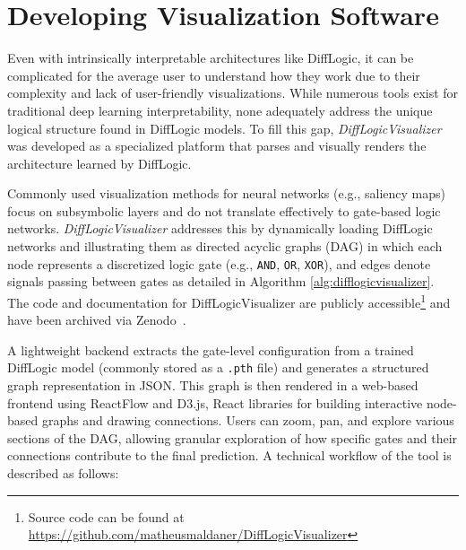 \section{Developing Visualization Software}
\label{sec:visualizationSoftware}
\label{sec:diffLogicVisualizer}

Even with intrinsically interpretable architectures like DiffLogic, it can be complicated for the average user to understand how they work due to their complexity and lack of user-friendly visualizations. While numerous tools exist for traditional deep learning interpretability, none adequately address the unique logical structure found in DiffLogic models. To fill this gap, \textit{DiffLogicVisualizer} was developed as a specialized platform that parses and visually renders the architecture learned by DiffLogic.

Commonly used visualization methods for neural networks (e.g., saliency maps) focus on subsymbolic layers and do not translate effectively to gate-based logic networks. \textit{DiffLogicVisualizer} addresses this by dynamically loading DiffLogic networks and illustrating them as directed acyclic graphs (DAG) in which each node represents a discretized logic gate (e.g., \texttt{AND}, \texttt{OR}, \texttt{XOR}), and edges denote signals passing between gates as detailed in Algorithm \ref{alg:difflogicvisualizer}. The code and documentation for DiffLogicVisualizer are publicly accessible\footnote{Source code can be found at \url{https://github.com/matheusmaldaner/DiffLogicVisualizer}} and have been archived via Zenodo~\cite{maldaner2025difflogicvisualizer}.

A lightweight backend extracts the gate-level configuration from a trained DiffLogic model (commonly stored as a \texttt{.pth} file) and generates a structured graph representation in JSON. This graph is then rendered in a web-based frontend using ReactFlow and D3.js, React libraries for building interactive node-based graphs and drawing connections. Users can zoom, pan, and explore various sections of the DAG, allowing granular exploration of how specific gates and their connections contribute to the final prediction. A technical workflow of the tool is described as follows:

